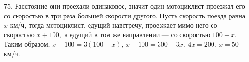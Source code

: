 75. Расстояние они проехали одинаковое, значит один мотоциклист проезжал его со скоростью в три раза большей скорости другого. Пусть скорость поезда равна $x$ км/ч, тогда мотоциклист, едущий навстречу, проезжает мимо него со скоростью $x+100,$ а едущий в том же направлении --- со скоростью $100-x.$ Таким образом, $x+100=3(100-x),\ x+100=300-3x,\ 4x=200,\ x=50$км/ч.\\
